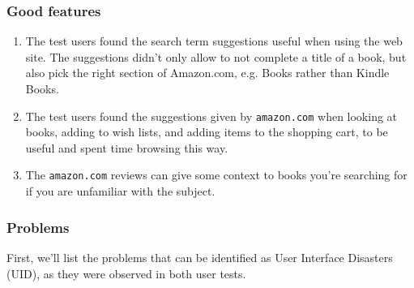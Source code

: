 \subsubsection{Good features}

\begin{enumerate}

\item The test users found the search term suggestions \cite[.4]{hearst} useful when using the web site. The suggestions didn't only
allow to not complete a title of a book, but also pick the right section of
Amazon.com, e.g. Books rather than Kindle Books.

\item The test users found the suggestions given by \texttt{amazon.com} when
looking at books, adding to wish lists, and adding items to the shopping cart,
to be useful and spent time browsing this way.

\item The \texttt{amazon.com} reviews can give some context to books you're
searching for if you are unfamiliar with the subject.

\end{enumerate}

\subsubsection{Problems}

First, we'll list the problems that can be identified as User Interface
Disasters (UID)\cite{molich}, as they were observed in both user tests.

